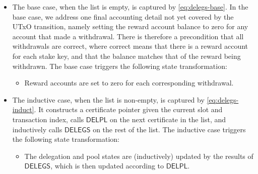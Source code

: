 \begin{itemize}
  \item The base case, when the list is empty, is captured by \cref{eq:delegs-base}.
    In the base case, we address one final accounting detail not yet covered by the UTxO
    transition, namely setting the reward account balance to zero for any account that made a
    withdrawal.  There is therefore a precondition that all withdrawals are correct, where
    correct means that there is a reward account for each stake key, and that the balance
    matches that of the reward being withdrawn.
    The base case triggers the following state transformation:
    \begin{itemize}
      \item Reward accounts are set to zero for each corresponding withdrawal.
    \end{itemize}
  \item The inductive case, when the list is non-empty, is captured by \cref{eq:delegs-induct}.
    It constructs a certificate pointer given the current slot and transaction index,
    calls $\mathsf{DELPL}$ on the next certificate in the list, and inductively
    calls $\mathsf{DELEGS}$ on the rest of the list.
    The inductive case triggers the following state transformation:
    \begin{itemize}
      \item The delegation and pool states are (inductively) updated by the results of
        $\mathsf{DELEGS}$, which is then updated according to $\mathsf{DELPL}$.
    \end{itemize}
\end{itemize}

